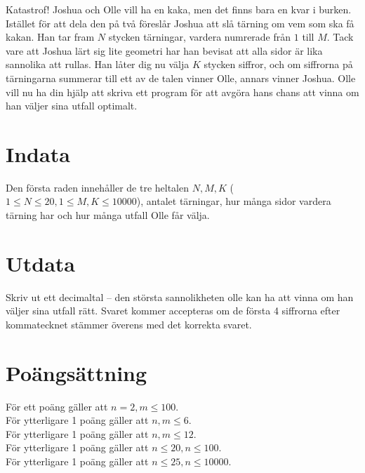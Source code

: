 Katastrof! Joshua och Olle vill ha en kaka, men det finns bara en kvar i burken. Istället för att dela den på två föreslår Joshua att slå tärning om vem som ska få kakan.
Han tar fram $N$ stycken tärningar, vardera numrerade från $1$ till $M$. Tack vare att Joshua lärt sig lite geometri har han bevisat att alla sidor är lika sannolika att rullas.
Han låter dig nu välja $K$ stycken siffror, och om siffrorna på tärningarna summerar till ett av de talen vinner Olle, annars vinner Joshua.
Olle vill nu ha din hjälp att skriva ett program för att avgöra hans chans att vinna om han väljer sina utfall optimalt.


\section*{Indata}
Den första raden innehåller de tre heltalen $N, M, K$ ($1 \le N \le 20, 1 \le M, K \le 10000$), antalet tärningar, hur många sidor vardera tärning har och hur många utfall Olle får välja.

\section*{Utdata}
Skriv ut ett decimaltal -- den största sannolikheten olle kan ha att vinna om han väljer sina utfall rätt. 
Svaret kommer accepteras om de första 4 siffrorna efter kommatecknet stämmer överens med det korrekta svaret.

\section*{Poängsättning}
För ett poäng gäller att $n = 2, m \le 100$.\\
För ytterligare 1 poäng gäller att $n, m \le 6$.\\
För ytterligare 1 poäng gäller att $n, m \le 12$.\\
För ytterligare 1 poäng gäller att $n \le 20, n \le 100$.\\
För ytterligare 1 poäng gäller att $n \le 25, n \le 10000$.\\